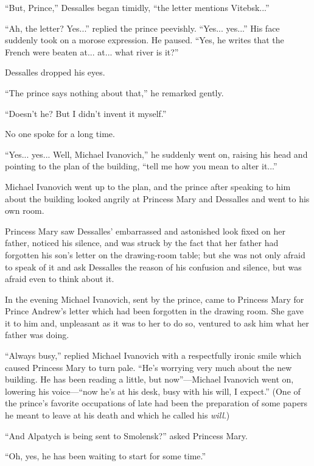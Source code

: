 ``But, Prince,'' Dessalles began timidly, ``the letter mentions
Vitebsk...''

``Ah, the letter? Yes...'' replied the prince
peevishly. ``Yes... yes...''  His face suddenly took on a morose
expression. He paused. ``Yes, he writes that the French were
beaten at... at... what river is it?''

Dessalles dropped his eyes.

``The prince says nothing about that,'' he remarked gently.

``Doesn't he? But I didn't invent it myself.''

No one spoke for a long time.

``Yes... yes... Well, Michael Ivanovich,'' he suddenly went on,
raising his head and pointing to the plan of the building, ``tell
me how you mean to alter it...''

Michael Ivanovich went up to the plan, and the prince after
speaking to him about the building looked angrily at Princess
Mary and Dessalles and went to his own room.

Princess Mary saw Dessalles' embarrassed and astonished look
fixed on her father, noticed his silence, and was struck by the
fact that her father had forgotten his son's letter on the
drawing-room table; but she was not only afraid to speak of it
and ask Dessalles the reason of his confusion and silence, but
was afraid even to think about it.

In the evening Michael Ivanovich, sent by the prince, came to
Princess Mary for Prince Andrew's letter which had been forgotten
in the drawing room. She gave it to him and, unpleasant as it was
to her to do so, ventured to ask him what her father was doing.

``Always busy,'' replied Michael Ivanovich with a respectfully
ironic smile which caused Princess Mary to turn pale. ``He's
worrying very much about the new building. He has been reading a
little, but now''---Michael Ivanovich went on, lowering his
voice---``now he's at his desk, busy with his will, I expect.''
(One of the prince's favorite occupations of late had been the
preparation of some papers he meant to leave at his death and
which he called his \emph{will}.)

``And Alpatych is being sent to Smolensk?'' asked Princess Mary.

``Oh, yes, he has been waiting to start for some time.''


